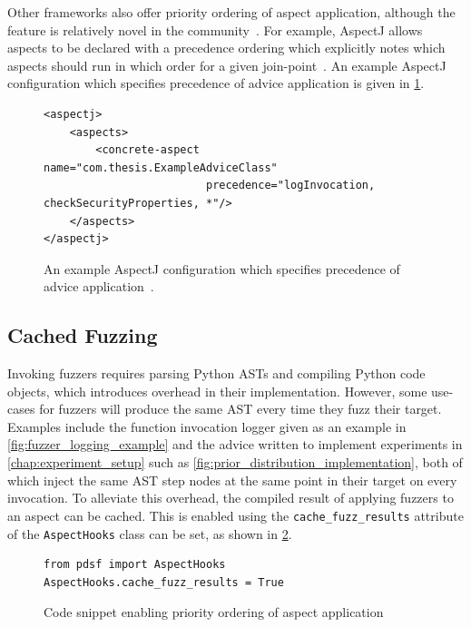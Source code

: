 Other \aop frameworks also offer priority ordering of aspect application,
although the feature is relatively novel in the
community~\cite{jalali2012aspect}. For example, AspectJ allows aspects to be
declared with a precedence ordering which explicitly notes which aspects should
run in which order for a given
join-point~\cite{aspectj-advice-precedence-documentation}. An example AspectJ
configuration which specifies precedence of advice application is given in
\cref{fig:aspectj-advice-precedence-config-example}.

\begin{figure}
\centering
\begin{lstlisting}[style=footnotesize_xml]
<aspectj>
    <aspects>
        <concrete-aspect name="com.thesis.ExampleAdviceClass"
                         precedence="logInvocation, checkSecurityProperties, *"/>
    </aspects>
</aspectj>
\end{lstlisting}
\caption{An example AspectJ configuration which specifies precedence of advice
application~\cite{aspectj-advice-precedence-documentation}.}
\label{fig:aspectj-advice-precedence-config-example}
\end{figure}


\subsection{Cached Fuzzing}
\label{subsec:cached_fuzzing}

Invoking fuzzers requires parsing Python ASTs and compiling Python code objects,
which introduces overhead in their implementation. However, some use-cases for
fuzzers will produce the same AST every time they fuzz their target. Examples
include the function invocation logger given as an example in
\cref{fig:fuzzer_logging_example} and the advice written to implement
experiments in \cref{chap:experiment_setup} such as
\cref{fig:prior_distribution_implementation}, both of which inject the same AST
step nodes at the same point in their target on every invocation. To alleviate
this overhead, the compiled result of applying fuzzers to an aspect can be
cached. This is enabled using the \lstinline{cache_fuzz_results} attribute of
the \lstinline{AspectHooks} class can be set, as shown in
\cref{fig:enabling_fuzzer_caching}.

\begin{figure}[h]
    \begin{lstlisting}[style=footnotesize_python]
from pdsf import AspectHooks
AspectHooks.cache_fuzz_results = True
    \end{lstlisting}
    \caption{Code snippet enabling priority ordering of aspect application}
    \label{fig:enabling_fuzzer_caching}
\end{figure}


